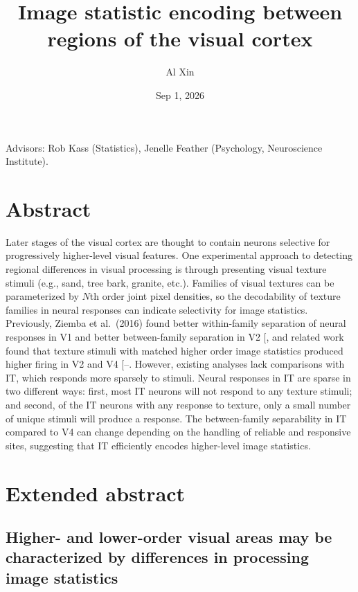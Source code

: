 \documentclass[
  11pt,
  letterpaper,
  DIV=11,
  numbers=noendperiod]{scrartcl}
\title{Image statistic encoding between regions of the visual cortex}
\author{\small Al Xin}
\date{Sep 1, 2026}
\renewcommand*\contentsname{Table of contents}
\newcommand\contentsname{Table of contents}
\begin{document}
\maketitle

\renewcommand*\contentsname{Table of contents}
{
\hypersetup{linkcolor=}
\setcounter{tocdepth}{3}
\tableofcontents
}

\pagebreak

Advisors: Rob Kass (Statistics), Jenelle Feather (Psychology,
Neuroscience Institute).

\section{Abstract}\label{abstract}

Later stages of the visual cortex are thought to contain neurons
selective for progressively higher-level visual features. One
experimental approach to detecting regional differences in visual
processing is through presenting visual texture stimuli (e.g., sand,
tree bark, granite, etc.). Families of visual textures can be
parameterized by \(N\)th order joint pixel densities, so the
decodability of texture families in neural responses can indicate
selectivity for image statistics. Previously, Ziemba et al.~(2016) found
better within-family separation of neural responses in V1 and better
between-family separation in V2
{[}\citeproc{ref-ziemba_selectivity_2016}{1}{]}, and related work found
that texture stimuli with matched higher order image statistics produced
higher firing in V2 and V4
{[}--\citeproc{ref-lee_emergence_2025}{4}{]}.
However, existing analyses lack comparisons with IT, which responds more
sparsely to stimuli. Neural responses in IT are sparse in two different
ways: first, most IT neurons will not respond to any texture stimuli;
and second, of the IT neurons with any response to texture, only a small
number of unique stimuli will produce a response. The between-family
separability in IT compared to V4 can change depending on the handling
of reliable and responsive sites, suggesting that IT efficiently encodes
higher-level image statistics.

\section{Extended abstract}\label{extended-abstract}

\subsection{Higher- and lower-order visual areas may be characterized by
differences in processing image
statistics}\label{higher--and-lower-order-visual-areas-may-be-characterized-by-differences-in-processing-image-statistics}
\end{document}
